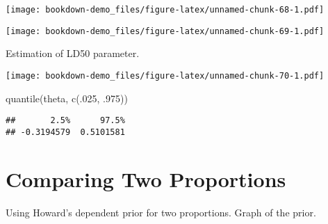 \documentclass[
]{book}
\newenvironment{Shaded}{\begin{snugshade}}{\end{snugshade}}
\newcommand{\AttributeTok}[1]{\textcolor[rgb]{0.77,0.63,0.00}{#1}}
\newcommand{\DecValTok}[1]{\textcolor[rgb]{0.00,0.00,0.81}{#1}}
\newcommand{\FloatTok}[1]{\textcolor[rgb]{0.00,0.00,0.81}{#1}}
\newcommand{\FunctionTok}[1]{\textcolor[rgb]{0.00,0.00,0.00}{#1}}
\newcommand{\NormalTok}[1]{#1}
\newcommand{\OtherTok}[1]{\textcolor[rgb]{0.56,0.35,0.01}{#1}}
\newcommand{\SpecialCharTok}[1]{\textcolor[rgb]{0.00,0.00,0.00}{#1}}
\newcommand{\StringTok}[1]{\textcolor[rgb]{0.31,0.60,0.02}{#1}}
\begin{document}
\texttt{[image: bookdown-demo\_files/figure-latex/unnamed-chunk-68-1.pdf]}

\begin{Shaded}
\end{Shaded}

\texttt{[image: bookdown-demo\_files/figure-latex/unnamed-chunk-69-1.pdf]}

Estimation of LD50 parameter.

\begin{Shaded}
\end{Shaded}

\texttt{[image: bookdown-demo\_files/figure-latex/unnamed-chunk-70-1.pdf]}

\begin{Shaded}
\begin{Highlighting}[]
\FunctionTok{quantile}\NormalTok{(theta, }\FunctionTok{c}\NormalTok{(.}\DecValTok{025}\NormalTok{, .}\DecValTok{975}\NormalTok{))}
\end{Highlighting}
\end{Shaded}

\begin{verbatim}
##       2.5%      97.5% 
## -0.3194579  0.5101581
\end{verbatim}

\hypertarget{comparing-two-proportions}{%
\section{Comparing Two Proportions}\label{comparing-two-proportions}}

Using Howard's dependent prior for two proportions.
Graph of the prior.
\end{document}
